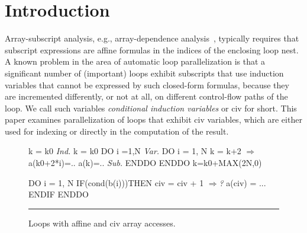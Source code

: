 \documentclass{sig-alternate}
\newcommand{\emp}[1]{\textcolor{DikuRed}{ #1}}
\newcommand{\emphh}[1]{\textcolor{CosGreen}{ #1}}
\newcommand{\mymath}[1]{$ #1 $}
\begin{document}





\section{Introduction}


\enlargethispage{\baselineskip}

Array-subscript analysis, e.g., array-dependence analysis~\cite{BanerjeeIneqTest,FeautrierDataflow,Pugh92theomega},
typically requires that subscript expressions are affine formulas
in the indices of the enclosing loop nest.   A known problem in 
the area of automatic loop parallelization is that a significant 
number of (important) loops exhibit subscripts 
that use induction variables that cannot be expressed by such closed-form 
formulas, because they are incremented differently, or not at all, on 
different control-flow paths of the loop.   We call such variables
{\em conditional induction variables} or {\sc civ} for short.
This paper examines parallelization of loops that exhibit 
{\sc civ} variables, which are either used for indexing or 
directly in the computation of the result.

\begin{figure}
\begin{minipage}{0.58\columnwidth}
\begin{colorcode}
k = k0     \emphh{\em Ind.}  k = k0        
DO i =1,N  \emphh{\em Var.}  DO i = 1, N      
  k = k+2    \emphh{\mymath{\Rightarrow}}    a(k0+2*i)=.. 
  a(k)=..  \emphh{\em Sub.}  ENDDO         
ENDDO            k=k0+MAX(2N,0)
\end{colorcode}
\end{minipage}
\begin{minipage}{0.35\columnwidth}
\begin{colorcode}
DO i = 1, N
 IF(cond(b(i)))THEN 
    civ = civ + 1 \emp{\mymath{\Rightarrow}{\em ?}} 
    a(civ) = ...
ENDIF ENDDO
\end{colorcode}
\end{minipage}
\hrule
\caption{Loops with affine and {\sc civ} array accesses.}
\label{fig:introEg}
\vspace{-2ex}
\end{figure}
\end{document}
